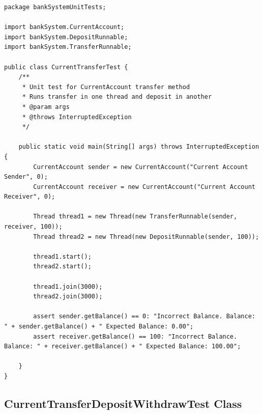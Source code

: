 \documentclass[a4paper,12pt]{article}
\begin{document}
\begin{lstlisting}
package bankSystemUnitTests;

import bankSystem.CurrentAccount;
import bankSystem.DepositRunnable;
import bankSystem.TransferRunnable;

public class CurrentTransferTest {
    /**
     * Unit test for CurrentAccount transfer method
     * Runs transfer in one thread and deposit in another
     * @param args
     * @throws InterruptedException
     */

    public static void main(String[] args) throws InterruptedException {
        CurrentAccount sender = new CurrentAccount("Current Account Sender", 0);
        CurrentAccount receiver = new CurrentAccount("Current Account Receiver", 0);

        Thread thread1 = new Thread(new TransferRunnable(sender, receiver, 100));
        Thread thread2 = new Thread(new DepositRunnable(sender, 100));

        thread1.start();
        thread2.start();

        thread1.join(3000);
        thread2.join(3000);

        assert sender.getBalance() == 0: "Incorrect Balance. Balance: " + sender.getBalance() + " Expected Balance: 0.00";
        assert receiver.getBalance() == 100: "Incorrect Balance. Balance: " + receiver.getBalance() + " Expected Balance: 100.00";

    }
}

\end{lstlisting}

\subsection{CurrentTransferDepositWithdrawTest Class} \label{appendix:CurrentTransferDepositWithdraw}
\end{document}
